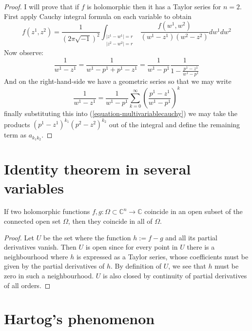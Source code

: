 \begin{proof}
I will prove that if $f$ is holomorphic then it has a Taylor series for $n=2$. 
First apply Cauchy integral formula on each variable to obtain
$$
f(z^1,z^2)=\frac{1}{(2\pi\sqrt{-1})^2}
\int_{\substack{|z^1-w^1|=r \\ |z^2-w^2|=r}}
\frac{f(w^1,w^2)}{(w^1-z^1)(w^2-z^2)}dw^1dw^2
$$
Now observe:
\begin{equation}
\label{equation-multivariablecauchy}
\frac{1}{w^1-z^1}=\frac{1}{w^1-p^1+p^1-z^1}
=\frac{1}{w^1-p^1}\frac{1}{1-\frac{p^1-z^1}{w^1-p^1}}
\end{equation}
And on the right-hand-side we have a geometric series so that we may write
$$
\frac{1}{w^1-z^1}
=\frac{1}{w^1-p^1}\sum_{k=0}^\infty\left(\frac{p^1-z^1}{w^1-p^1}\right)^k
$$
finally substituting this into (\ref{equation-multivariablecauchy}) we may take
the products $(p^1-z^1)^{k_1}(p^2-z^2)^{k_2}$ out of the integral and define the
remaining term as $a_{k_1k_2}$.
\end{proof}

\section{Identity theorem in several variables}
\label{section-identity-theorem-in-several-variables}

\begin{theorem}
\label{theorem-identity-several-variables}
\begin{reference}
\cite[Proposition 1.28]{lec}
\end{reference}
If two holomorphic functions $f,g:\Omega\subset \mathbb{C}^n \to \mathbb{C}$ coincide
in an open subset of the connected open set $\Omega$, 
then they coincide in all of $\Omega$.
\end{theorem}

\begin{proof}
Let $U$ be the set where the function $h:=f-g$ and all its partial derivatives
vanish. Then $U$ is open since for every point in $U$ there is a neighbourhood
where $h$ is expressed as a Taylor series, whose coefficients must be given by
the partial derivatives of $h$. By definition of $U$, we see that $h$ must be
zero in such a neighbourhood. $U$ is also closed by continuity of partial
derivatives of all orders. 
\end{proof}

\section{Hartog's phenomenon}
\label{section-hartog}

